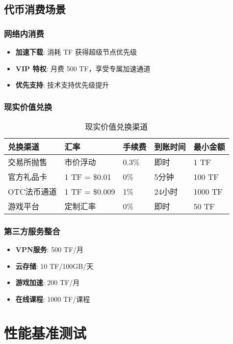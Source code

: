 \documentclass[12pt,a4paper]{article}
\begin{document}
\subsection{代币消费场景}

\subsubsection{网络内消费}
\begin{itemize}
    \item \textbf{加速下载}: 消耗 TF 获得超级节点优先级
    \item \textbf{VIP 特权}: 月费 500 TF，享受专属加速通道
    \item \textbf{优先支持}: 技术支持优先级提升
\end{itemize}

\subsubsection{现实价值兑换}

\begin{table}[h]
\centering
\begin{tabular}{|l|l|l|l|l|}
\hline
\textbf{兑换渠道} & \textbf{汇率} & \textbf{手续费} & \textbf{到账时间} & \textbf{最小金额} \\
\hline
交易所抛售 & 市价浮动 & 0.3\% & 即时 & 1 TF \\
\hline
官方礼品卡 & 1 TF = \$0.01 & 0\% & 5分钟 & 100 TF \\
\hline
OTC法币通道 & 1 TF = \$0.009 & 1\% & 24小时 & 1000 TF \\
\hline
游戏平台 & 定制汇率 & 0\% & 即时 & 50 TF \\
\hline
\end{tabular}
\caption{现实价值兑换渠道}
\end{table}

\subsubsection{第三方服务整合}
\begin{itemize}
    \item \textbf{VPN服务}: 500 TF/月
    \item \textbf{云存储}: 10 TF/100GB/天
    \item \textbf{游戏加速}: 200 TF/月
    \item \textbf{在线课程}: 1000 TF/课程
\end{itemize}

\section{性能基准测试}
\end{document}
